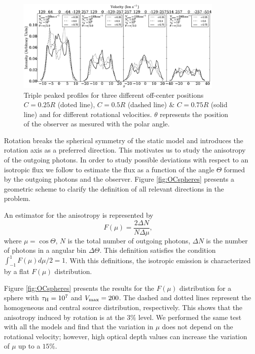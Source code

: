 \documentclass{emulateapj}
\newcommand{\kms}{{\ifmmode{{\mathrm{\,km\ s}^{-1}}}\else{\,km~s$^{-1}$}\fi}}
\begin{document}
\begin{figure}
\begin{center}
\includegraphics[width=0.90\textwidth]{f11.eps}
\end{center}
\caption{Triple peaked profiles for three different off-center positions
  $C=0.25R$ (doted line), $C=0.5R$ (dashed line) \& $C=0.75R$ (solid
  line) and for different rotational velocities. $\theta$ represents
  the position of the observer as mesured with the polar angle.
   \label{fig:3p_profiles}} 
\end{figure}


Rotation breaks the spherical symmetry of the static model and
introduces the rotation axis as a preferred direction. This motivates
us to study the anisotropy of the outgoing photons. In order to study
possible deviations with respect to an isotropic flux we follow
\cite{Zheng2013} to estimate the flux as a function of the angle
$\Theta$ formed by the outgoing photons and the observer. Figure
\ref{fig:OCspheres} presents a geometric scheme to clarify the
definition of all relevant directions in the problem.

An estimator for the anisotropy is represented by
%
\begin{equation}
F(\mu) = \frac{2\Delta N}{N\Delta \mu}, 
\end{equation} 
%
where $\mu=\cos\Theta$, $N$ is the total number of outgoing photons,
$\Delta N$ is the number of photons in a angular bin $\Delta
\Theta$. This definition satisfies the condition
$\int_{-1}^{1}F(\mu)d\mu/2=1$.  With this definitions, the isotropic
emission is characterized by a flat $F(\mu)$ distribution. 


Figure \ref{fig:OCspheres} presents the results for the $F(\mu)$
distribution for a sphere with $\tau_{\rm H}=10^{7}$ and $V_{\rm
  max}=200$\kms. The dashed and dotted lines represent the homogeneous
and central source distribution, respectively. This shows that the
 anisotropy induced by rotation is at the $3\%$ level. We
performed the same test with all the models and find that the
variation in $\mu$ does not depend on the rotational velocity;
however, high optical depth values can increase the variation of
$\mu$ up to a $15\%$. 
\end{document}
